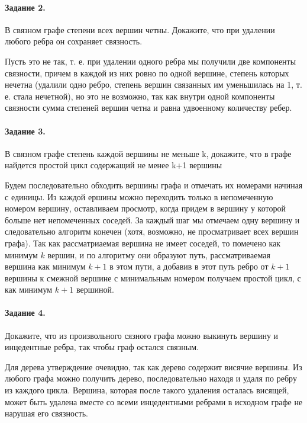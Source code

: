 \documentclass[a4paper,12pt]{article}
\begin{document}
\paragraph{Задание 2.} В связном графе степени всех вершин четны. Докажите, что при удалении любого ребра он сохраняет связность.
\begin{Solution}
Пусть это не так, т. е. при удалении одного ребра мы получили две компоненты связности, причем в каждой из них ровно по одной вершине, степень которых нечетна (удалили одно ребро, степень вершин связанных им уменьшилась на 1, т. е. стала нечетной), но это не возможно, так как внутри одной компоненты связности сумма степеней вершин четна и равна удвоенному количеству ребер.
\end{Solution}

\paragraph{Задание 3.} В связном графе степень каждой вершины не меньше k, докажите, что в графе найдется простой цикл содержащий не менее k+1 вершины
\begin{Solution}
Будем последовательно обходить вершины графа и отмечать их номерами начиная с единицы. Из каждой ершины можно переходить только в непомеченную номером вершину, оставливаем просмотр, когда придем в вершину у которой больше нет непомеченных соседей. За каждый шаг мы отмечаем одну вершину и следовательно алгоритм конечен (хотя, возможно, не просматривает всех вершин графа). Так как рассматриаемая вершина не имеет соседей, то помечено как минимум $k$ вершин, и по алгоритму они образуют путь, рассматриваемая вершина как минимум $k+1$ в этом пути, а добавив в этот путь ребро от $k+1$ вершины к смежной вершине с минимальным номером получаем простой цикл, с как минимум $k+1$ вершиной.
\end{Solution}

\paragraph{Задание 4.} Докажите, что из произвольного сязного графа можно выкинуть вершину и инцедентные ребра, так чтобы граф остался связным.
\begin{Solution}
Для дерева утверждение очевидно, так как дерево содержит висячие вершины. Из любого графа можно получить дерево, последовательно находя и удаля по ребру из каждого цикла. Вершина, которая после такого удаления осталась висящей, может быть удалена вместе со всеми инцедентными ребрами в исходном графе не нарушая его связность.
\end{Solution}
\end{document}
